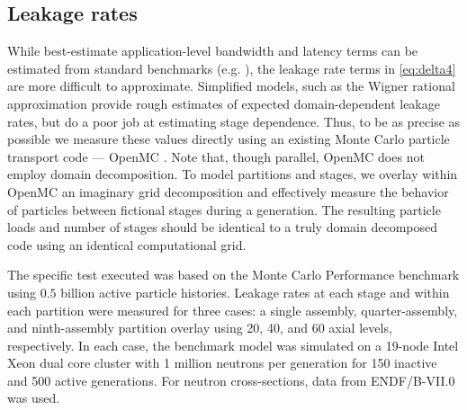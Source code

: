 \subsection{Leakage rates}

While best-estimate application-level bandwidth and latency terms can be
estimated from standard benchmarks (e.g. \cite{cpe-wallcraft-2000}), the leakage
rate terms in \eqref{eq:delta4} are more difficult to approximate. Simplified
models, such as the Wigner rational approximation \cite{ae-pashkin-1970} provide
rough estimates of expected domain-dependent leakage rates, but do a poor job at
estimating stage dependence. Thus, to be as precise as possible we measure these
values directly using an existing Monte Carlo particle transport code --- OpenMC
\cite{ane-romano-2013}. Note that, though parallel, OpenMC does not employ
domain decomposition. To model partitions and stages, we overlay within OpenMC
an imaginary grid decomposition and effectively measure the behavior of
particles between fictional stages during a generation. The resulting particle
loads and number of stages should be identical to a truly domain decomposed code
using an identical computational grid.

The specific test executed was based on the Monte Carlo Performance benchmark
\cite{mc-hoogenboom-2011} using $0.5$ billion active particle histories.
Leakage rates at each stage and within each partition were measured for three
cases: a single assembly, quarter-assembly, and ninth-assembly partition overlay
using 20, 40, and 60 axial levels, respectively. In each case, the benchmark
model was simulated on a 19-node Intel Xeon dual core cluster with 1 million
neutrons per generation for 150 inactive and 500 active generations. For neutron
cross-sections, data from ENDF/B-VII.0 was used.

